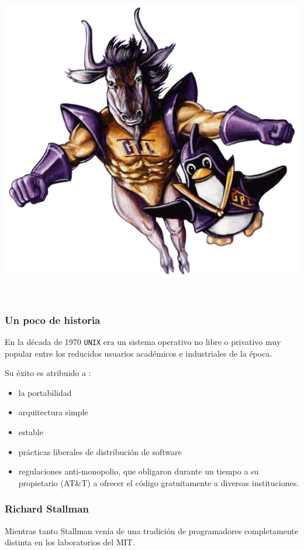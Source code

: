 \documentclass[11pt]{article}
\begin{document}
\begin{center}
\includegraphics[width=.9\linewidth]{Versiones/Gnu-and-penguin-color.png}
\end{center}  

\subsubsection{Un poco de historia}
\label{sec:orgb740793}
En la década de 1970 \texttt{UNIX} era un sistema operativo no libre o
privativo muy popular entre los reducidos usuarios académicos e
industriales de la época.

Su éxito es atribuido a :

\begin{itemize}
\item la portabilidad
\item arquitectura simple
\item estable
\item prácticas liberales de distribución de software
\item regulaciones anti-monopolio, que obligaron durante un tiempo a su
propietario (AT\&T) a ofrecer el código gratuitamente a diversas
instituciones.
\end{itemize}

\subsubsection{Richard Stallman}
\label{sec:orge28ed5f}
Mientras tanto Stallman venía de una tradición de programadores
completamente distinta en los laboratorios del MIT.
\end{document}
